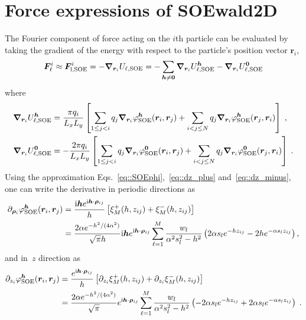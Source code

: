 \section{Force expressions of SOEwald2D} \label{app::force}

The Fourier component of force acting on the $i$th particle can be evaluated by taking the gradient of the energy with respect to the particle's position vector $\bm{r}_{i}$,
\begin{equation}\label{eq::Fi}
	\boldsymbol{F}_{\ell}^i  \approx \boldsymbol{F}^{i}_{\text{l},\text{SOE}} = -\boldsymbol{\nabla}_{\boldsymbol{r}_{i}} U_{\ell,\text{SOE}} =  -\sum_{\bm{h}\neq \bm{0}} \boldsymbol{\nabla}_{\boldsymbol{r}_{i}}U_{\ell,\text{SOE}}^{\boldsymbol{h}} -\boldsymbol{\nabla}_{\boldsymbol{r}_{i}} U_{\ell,\text{SOE}}^{\boldsymbol{0}}
\end{equation}
where
\begin{align}    
	\boldsymbol{\nabla}_{\boldsymbol{r}_{i}}U_{\ell,\text{SOE}}^{\boldsymbol{h}} &= \frac{\pi q_{i}}{L_x L_y} \left[ \sum_{1 \leq j < i} q_{j} \boldsymbol{\nabla}_{\boldsymbol{r}_{i}} \varphi_{\text{SOE}}^{\boldsymbol{h}}(\boldsymbol{r}_{i}, \boldsymbol{r}_{j}) +  \sum_{i < j \leq N} q_{j} \boldsymbol{\nabla}_{\boldsymbol{r}_{i}} \varphi_{\text{SOE}}^{\boldsymbol{h}}(\boldsymbol{r}_{j}, \boldsymbol{r}_{i}) \right]\;,\\
	\boldsymbol{\nabla}_{\boldsymbol{r}_{i}} U_{\ell,\text{SOE}}^{\boldsymbol{0}} &= - \frac{2 \pi q_{i}}{L_x L_y} \left[ \sum_{1 \leq j < i} q_{j} \boldsymbol{\nabla}_{\boldsymbol{r}_{i}} \varphi^{\bm{0}}_{\text{SOE}}(\bm{r}_{i}, \bm{r}_{j}) + \sum_{i < j \leq N} q_{j} \boldsymbol{\nabla}_{\boldsymbol{r}_{i}} \varphi^{\bm{0}}_{\text{SOE}}(\bm{r}_{j}, \bm{r}_{i})\right]\;.
\end{align}
Using the approximation Eqs.~\eqref{eq::SOEphi},~\eqref{eq::dz_plus} and~\eqref{eq::dz_minus}, one can write the derivative in periodic directions as
\begin{equation}
	\begin{split}
		\partial_{\bm{\rho}_{i}} \varphi_{\text{SOE}}^{\boldsymbol{h}}(\boldsymbol{r}_{i}, \boldsymbol{r}_{j}) & = \frac{\mathrm{i} \boldsymbol{h} e^{ \mathrm{i} \boldsymbol{h} \cdot \boldsymbol{\rho}_{ij}}}{h} \left[\xi^{+}_M(h, z_{ij})+\xi^{-}_M(h, z_{ij})\right]\\
		&=\frac{2\alpha e^{-h^2/(4\alpha^2)}}{\sqrt{\pi}h} \mathrm{i} \bm{h}e^{\mathrm{i} \boldsymbol{h} \cdot \boldsymbol{\rho}_{ij}} \sum_{\ell = 1}^{M}  \frac{w_l}{\alpha^2 s_l^2 - h^2}\left( 2 \alpha s_l e^{-h z_{ij}} - 2 h e^{-\alpha s_l z_{ij}}\right),
	\end{split}
\end{equation}
and in~$z$ direction as
\begin{equation}\label{eq:z-der}
	\begin{split}
		\partial_{z_{i}} \varphi_{\text{SOE}}^{\boldsymbol{h}}(\boldsymbol{r}_{i}, \boldsymbol{r}_{j}) & = \frac{e^{\mathrm{i} \boldsymbol{h} \cdot \boldsymbol{\rho}_{ij}}}{h} \left[\partial_{z_{i}} \xi^{+}_M(h, z_{ij}) + \partial_{z_{i}} \xi^{-}_M(h, z_{ij})\right]\\
		&=\frac{2 \alpha e^{-h^2/(4\alpha^2)}}{\sqrt{\pi}}e^{ \mathrm{i} \boldsymbol{h} \cdot \boldsymbol{\rho}_{ij}} \sum_{\ell = 1}^{M}  \frac{w_l}{\alpha^2 s_l^2 - h^2}\left( - 2 \alpha s_l e^{-h z_{ij}} + 2 \alpha s_l e^{- \alpha s_l z_{ij}}\right)\;.
	\end{split}
\end{equation}
